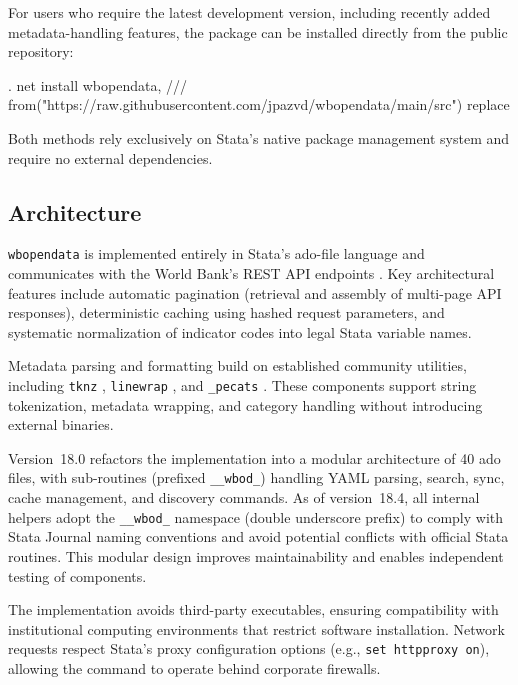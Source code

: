 \documentclass[bib]{statapress}
\begin{document}
For users who require the latest development version, including recently added
metadata-handling features, the package can be installed directly from the
public repository:

\begin{stlog}
. net install wbopendata, ///
  from("https://raw.githubusercontent.com/jpazvd/wbopendata/main/src") replace
\nullskip
\end{stlog}

Both methods rely exclusively on Stata’s native package management system and
require no external dependencies.

\subsection{Architecture}

\texttt{wbopendata} is implemented entirely in Stata’s ado-file language and
communicates with the World Bank’s REST API endpoints \citep{worldbank2024api}.
Key architectural features include automatic pagination (retrieval and assembly
of multi-page API responses), deterministic caching using hashed request
parameters, and systematic normalization of indicator codes into legal Stata
variable names.

Metadata parsing and formatting build on established community utilities,
including \texttt{tknz} \citep{elliott2002tknz}, \texttt{linewrap}
\citep{overazevedo2000linewrap}, and \texttt{\_pecats}
\citep{longfreese2001pecats}. These components support string tokenization,
metadata wrapping, and category handling without introducing external binaries.

Version~18.0 refactors the implementation into a modular architecture of 40 ado
files, with sub-routines (prefixed \texttt{\_\_wbod\_}) handling YAML parsing,
search, sync, cache management, and discovery commands. As of version~18.4, all
internal helpers adopt the \texttt{\_\_wbod\_} namespace (double underscore
prefix) to comply with Stata Journal naming conventions and avoid potential
conflicts with official Stata routines. This modular design improves
maintainability and enables independent testing of components.

The implementation avoids third-party executables, ensuring compatibility with
institutional computing environments that restrict software installation.
Network requests respect Stata's proxy configuration options (e.g.,
\texttt{set httpproxy on}), allowing the command to operate behind corporate
firewalls.
\end{document}
